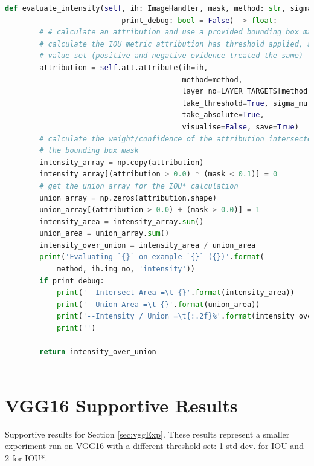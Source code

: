 \documentclass[main]{subfiles}
\begin{document}
\begin{lstlisting}[language=Python,basicstyle=\scriptsize]
    def evaluate_intensity(self, ih: ImageHandler, mask, method: str, sigma: int, 
                           print_debug: bool = False) -> float:
        # # calculate an attribution and use a provided bounding box mask to 
        # calculate the IOU metric attribution has threshold applied, and abs 
        # value set (positive and negative evidence treated the same)
        attribution = self.att.attribute(ih=ih,
                                         method=method,
                                         layer_no=LAYER_TARGETS[method][self.model_name],
                                         take_threshold=True, sigma_multiple=sigma, 
                                         take_absolute=True,
                                         visualise=False, save=True)
        # calculate the weight/confidence of the attribution intersected with 
        # the bounding box mask
        intensity_array = np.copy(attribution)
        intensity_array[(attribution > 0.0) * (mask < 0.1)] = 0
        # get the union array for the IOU* calculation
        union_array = np.zeros(attribution.shape)
        union_array[(attribution > 0.0) + (mask > 0.0)] = 1
        intensity_area = intensity_array.sum()
        union_area = union_array.sum()
        intensity_over_union = intensity_area / union_area
        print('Evaluating `{}` on example `{}` ({})'.format(
            method, ih.img_no, 'intensity'))
        if print_debug:
            print('--Intersect Area =\t {}'.format(intensity_area))
            print('--Union Area =\t {}'.format(union_area))
            print('--Intensity / Union =\t{:.2f}%'.format(intensity_over_union * 100))
            print('')

        return intensity_over_union



\end{lstlisting}


\chapter{VGG16 Supportive Results}

Supportive results for Section \ref{sec:vggExp}. These results represent a smaller experiment run on VGG16 with a different threshold set: 1 std dev. for IOU and 2 for IOU*.

\end{document}
